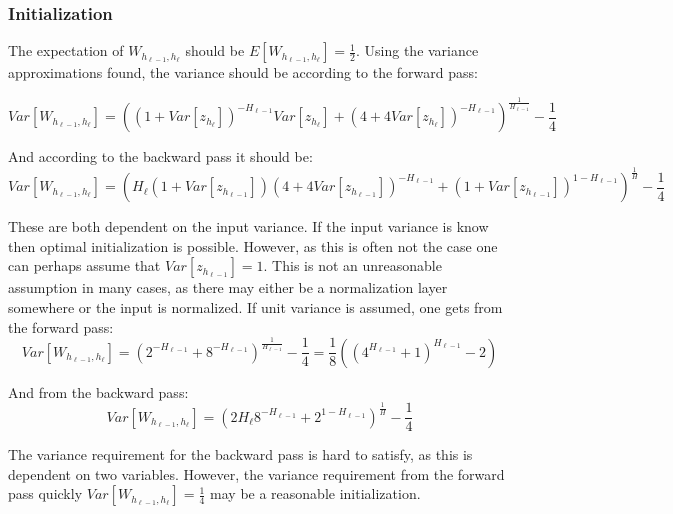 \subsubsection{Initialization}

The expectation of $W_{h_{\ell-1},h_\ell}$ should be $E[W_{h_{\ell-1},h_\ell}] = \frac{1}{2}$. Using the variance approximations found, the variance should be according to the forward pass:

\begin{equation}
Var[W_{h_{\ell-1},h_\ell}] = \left((1 + Var[z_{h_\ell}])^{-H_{\ell-1}}Var[z_{h_\ell}] + (4 + 4Var[z_{h_\ell}])^{-H_{\ell-1}}\right)^{\frac{1}{H_{\ell-1}}} - \frac{1}{4}
\end{equation}

And according to the backward pass it should be:
\begin{equation}
Var[W_{h_{\ell-1},h_\ell}] = \left(H_\ell (1 + Var[z_{h_{\ell-1}}]) (4 + 4 Var[z_{h_{\ell-1}}])^{-H_{\ell-1}} + (1 + Var[z_{h_{\ell-1}}])^{1 - H_{\ell-1}}\right)^{\frac{1}{H}} - \frac{1}{4}
\end{equation}

These are both dependent on the input variance. If the input variance is know then optimal initialization is possible. However, as this is often not the case one can perhaps assume that $Var[z_{h_{\ell-1}}] = 1$. This is not an unreasonable assumption in many cases, as there may either be a normalization layer somewhere or the input is normalized. If unit variance is assumed, one gets from the forward pass:
\begin{equation}
Var[W_{h_{\ell-1},h_\ell}] = \left(2^{-H_{\ell-1}} + 8^{-H_{\ell-1}}\right)^{\frac{1}{H_{\ell-1}}} - \frac{1}{4} = \frac{1}{8} \left(\left(4^{H_{\ell-1}} + 1\right)^{H_{\ell-1}} - 2\right)
\end{equation}

And from the backward pass:
\begin{equation}
Var[W_{h_{\ell-1},h_\ell}] = \left(2 H_\ell  8^{-H_{\ell-1}} + 2^{1 - H_{\ell-1}}\right)^{\frac{1}{H}} - \frac{1}{4}
\end{equation}

The variance requirement for the backward pass is hard to satisfy, as this is dependent on two variables. However, the variance requirement from the forward pass quickly $Var[W_{h_{\ell-1},h_\ell}] = \frac{1}{4}$ may be a reasonable initialization.

